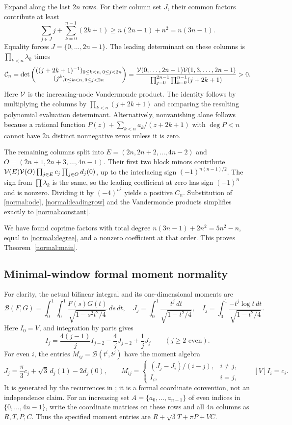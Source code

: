 \documentclass[11pt,a4paper]{article}
\numberwithin{equation}{section}
\theoremstyle{definition}\newtheorem{definition}[theorem]{Definition}
\theoremstyle{remark}\newtheorem{remark}[theorem]{Remark}
\newcommand{\B}{\mathcal B}\newcommand{\N}{\mathcal N}\newcommand{\M}{\mathcal M}
\begin{document}
Expand along the last $2n$ rows. For their column set $J$, their common factors contribute at least
\[
 \sum_{j\in J}j+\sum_{k=0}^{n-1}(2k+1)
 \ge n(2n-1)+n^2=n(3n-1).
\]
Equality forces $J=\{0,\ldots,2n-1\}$. The leading determinant on these columns is $\prod_{k<n}\lambda_k$ times
\[
 \mathcal C_n=\det\begin{pmatrix}
 ((j+2k+1)^{-1})_{0\le k<n,\,0\le j<2n}\\
 (j^k)_{0\le k<n,\,0\le j<2n}
 \end{pmatrix}
 =\frac{\mathcal V(0,\ldots,2n-1)\mathcal V(1,3,\ldots,2n-1)}
 {\prod_{j=0}^{2n-1}\prod_{k=0}^{n-1}(j+2k+1)}>0.
\]
Here $\mathcal V$ is the increasing-node Vandermonde product. The identity follows by multiplying the columns by $\prod_{k<n}(j+2k+1)$ and comparing the resulting polynomial evaluation determinant. Alternatively, nonvanishing alone follows because a rational function $P(z)+\sum_{k<n}a_k/(z+2k+1)$ with $\deg P<n$ cannot have $2n$ distinct nonnegative zeros unless it is zero.

The remaining columns split into
$E=(2n,2n+2,\ldots,4n-2)$ and $O=(2n+1,2n+3,\ldots,4n-1)$.
Their first two block minors contribute
$\mathcal V(E)\mathcal V(O)\prod_{j\in E}c_j\prod_{j\in O}d_j(0)$, up to the interlacing sign $(-1)^{n(n-1)/2}$. The sign from $\prod\lambda_k$ is the same, so the leading coefficient at zero has sign $(-1)^n$ and is nonzero. Dividing it by $(-4)^{n^2}$ yields a positive $C_n$. Substitution of \eqref{normal:ode}, \eqref{normal:leadingrow} and the Vandermonde products simplifies exactly to \eqref{normal:constant}.

We have found coprime factors with total degree
$n(3n-1)+2n^2=5n^2-n$, equal to \eqref{normal:degree}, and a nonzero coefficient at that order. This proves Theorem~\ref{normal:main}.

\subsection{Minimal-window formal moment normality}
For clarity, the actual bilinear integral and its one-dimensional moments are
\[
 \B(F,G)=\int_0^1\!\int_0^1\frac{F(s)G(t)}{\sqrt{1-s^2t^2/4}}\,ds\,dt,
 \quad J_j=\int_0^1\frac{t^j\,dt}{\sqrt{1-t^2/4}},
 \quad I_j=\int_0^1\frac{-t^j\log t\,dt}{\sqrt{1-t^2/4}}.
\]
Here $I_0=V$, and integration by parts gives
\[
 I_j=\frac{4(j-1)}j I_{j-2}-\frac4jJ_{j-2}+\frac1jJ_j
 \qquad(j\ge2\text{ even}).
\]
For even $i$, the entries $M_{ij}=\B(t^i,t^j)$ have the moment algebra
\[
 J_j=\frac\pi3c_j+\sqrt3\,d_j(1)-2d_j(0),\qquad
 M_{ij}=\begin{cases}(J_j-J_i)/(i-j),&i\ne j,\\I_i,&i=j,\end{cases}
 \qquad [V]I_i=c_i.
\]
It is generated by the recurrences in \cite{T05}; it is a formal coordinate convention, not an independence claim. For an increasing set $A=\{a_0,\ldots,a_{n-1}\}$ of even indices in $\{0,\ldots,4n-1\}$, write the coordinate matrices on these rows and all $4n$ columns as $R,T,P,C$. Thus the specified moment entries are $R+\sqrt3 T+\pi P+VC$.
\end{document}

